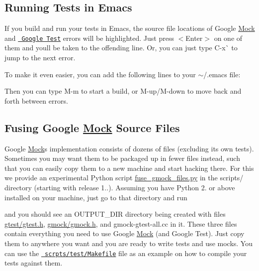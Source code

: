 \subsection*{Running Tests in Emacs}

If you build and run your tests in Emacs, the source file locations of Google \mbox{\hyperlink{classMock}{Mock}} and \href{../../googletest/}{\texttt{ Google Test}} errors will be highlighted. Just press {\ttfamily $<$Enter$>$} on one of them and you\textquotesingle{}ll be taken to the offending line. Or, you can just type {\ttfamily C-\/x}\`{} to jump to the next error.

To make it even easier, you can add the following lines to your {\ttfamily $\sim$/.emacs} file\+:


\begin{DoxyCode}{0}
\end{DoxyCode}


Then you can type {\ttfamily M-\/m} to start a build, or {\ttfamily M-\/up}/{\ttfamily M-\/down} to move back and forth between errors.

\subsection*{Fusing Google \mbox{\hyperlink{classMock}{Mock}} Source Files}

Google \mbox{\hyperlink{classMock}{Mock}}\textquotesingle{}s implementation consists of dozens of files (excluding its own tests). Sometimes you may want them to be packaged up in fewer files instead, such that you can easily copy them to a new machine and start hacking there. For this we provide an experimental Python script {\ttfamily \mbox{\hyperlink{fuse__gmock__files_8py}{fuse\+\_\+gmock\+\_\+files.\+py}}} in the {\ttfamily scripts/} directory (starting with release 1..). Assuming you have Python 2. or above installed on your machine, just go to that directory and run 
\begin{DoxyCode}{0}
\end{DoxyCode}


and you should see an {\ttfamily O\+U\+T\+P\+U\+T\+\_\+\+D\+IR} directory being created with files {\ttfamily \mbox{\hyperlink{gtest_8h}{gtest/gtest.\+h}}}, {\ttfamily \mbox{\hyperlink{gmock_8h}{gmock/gmock.\+h}}}, and {\ttfamily gmock-\/gtest-\/all.\+cc} in it. These three files contain everything you need to use Google \mbox{\hyperlink{classMock}{Mock}} (and Google Test). Just copy them to anywhere you want and you are ready to write tests and use mocks. You can use the \href{../scripts/test/Makefile}{\texttt{ scrpts/test/\+Makefile}} file as an example on how to compile your tests against them.

